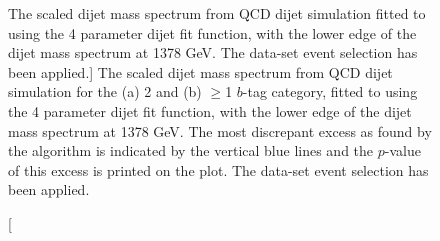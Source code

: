 \begin{figure}[!ht]
 \vspace{-0.2em}
  \begin{center}
    \captionsetup[subfigure]{aboveskip=0pt,justification=centering}
  \end{center}
  \vspace{-1em}
  \caption
      [The scaled dijet mass spectrum from QCD dijet simulation
        fitted to using the 4 parameter dijet fit function, with the lower edge of the dijet mass spectrum at 1378 GeV.
        The \summer{} data-set event selection has been applied.]
      { The scaled dijet mass spectrum from QCD dijet simulation for the (a) 2 and (b) $\geq$1 $b$-tag  category,
       fitted to using the 4 parameter dijet fit function, with the lower edge of the dijet mass spectrum at 1378 GeV.
       The most discrepant excess as found by the \bh{} algorithm is indicated by the vertical blue lines and the \mbox{$p$-value} of this excess is printed on the plot.
       The \summer{} data-set event selection has been applied.}
  \label{fig:Short_4para_1378_figure1}
\end{figure}

